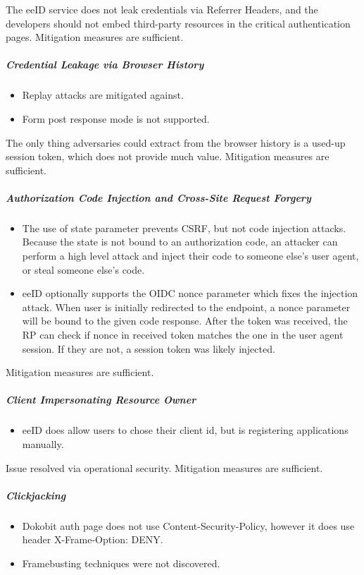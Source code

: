 The eeID service does not leak credentials via Referrer Headers, and the developers should not embed third-party resources in the critical authentication pages. Mitigation measures are sufficient.

\subparagraph{Credential Leakage via Browser History}

\begin{itemize}
  \item Replay attacks are mitigated against.
  \item Form post response mode is not supported.
\end{itemize}

The only thing adversaries could extract from the browser history is a used-up session token, which does not provide much value. Mitigation measures are sufficient.

\subparagraph{Authorization Code Injection and Cross-Site Request Forgery}

\begin{itemize}
  \item The use of state parameter prevents CSRF, but not code injection attacks. Because the state is not bound to an authorization code, an attacker can perform a high level attack and inject their code to someone else's user agent, or steal someone else's code.
  \item eeID optionally supports the OIDC nonce parameter which fixes the injection attack. When user is initially redirected to the endpoint, a nonce parameter will be bound to the given code response. After the token was received, the RP can check if nonce in received token matches the one in the user agent session. If they are not, a session token was likely injected.
\end{itemize}

Mitigation measures are sufficient.

\subparagraph{Client Impersonating Resource Owner}

\begin{itemize}
  \item eeID does allow users to chose their client id, but is registering applications manually.
\end{itemize}

Issue resolved via operational security. Mitigation measures are sufficient.

\subparagraph{Clickjacking}

\begin{itemize}
  \item Dokobit auth page does not use Content-Security-Policy, however it does use header X-Frame-Option: {DENY}.
  \item Framebusting \cite{RYDSTEDT2010BUSTI} techniques were not discovered.
\end{itemize}

